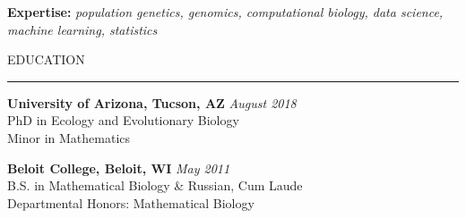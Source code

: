 \documentclass{resume} %
\renewenvironment{rSection}[1]{
\sectionskip
\textcolor{RoyalPurple}{\MakeUppercase{#1}}
\sectionlineskip
\hrule
\begin{list}{}{
\setlength{\leftmargin}{1.5em}
}
\item[]
}{
\end{list}
}
\begin{document}

\textcolor{RoyalPurple}{\bf Expertise:}
\textcolor{RoyalPurple}{\em population genetics, genomics, computational biology, data science, machine learning, statistics}

\begin{rSection}{Education}

{\bf University of Arizona, Tucson, AZ} \hfill {\em August 2018} \\ 
PhD in Ecology and Evolutionary Biology \\
Minor in Mathematics 

{\bf Beloit College, Beloit, WI} \hfill {\em May 2011} \\ 
B.S. in Mathematical Biology \& Russian, Cum Laude \\
Departmental Honors: Mathematical Biology

\end{rSection}

\end{document}
